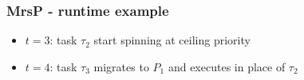 \documentclass{beamer}
\begin{document}
\begin{frame}
\frametitle{MrsP - runtime example}
\centerline{}
\centerline{}
\begin{itemize}
\item $t=3$: task $\tau_2$ start spinning at ceiling priority
\item $t=4$: task $\tau_3$ migrates to $P_1$ and executes in place of $\tau_2$ 
\end{itemize}
\end{frame}
\end{document}
